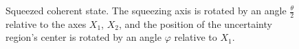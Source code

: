 \begin{figure}
\centering



\caption{Squeezed coherent state. The squeezing axis is rotated by an angle $\frac{\theta}{2}$ relative to the axes $X_1$, $X_2$, and the position of the uncertainty region's center is rotated by an angle $\varphi$ relative to $X_1$.}
\label{figPart3Squeezed_9}
\end{figure}